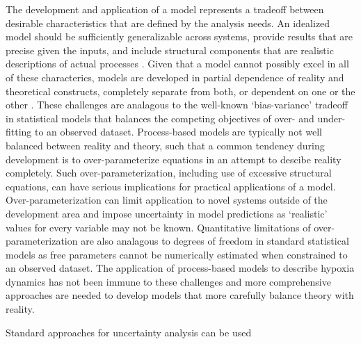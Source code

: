 \documentclass[letterpaper,12pt,oneside]{article}\usepackage[]{graphicx}\usepackage[]{color}
\begin{document}
The development and application of a model represents a tradeoff between desirable characteristics that are defined by the analysis needs.  An idealized model should be sufficiently generalizable across systems, provide results that are precise given the inputs, and include structural components that are realistic descriptions of actual processes \citep{Levins66}. Given that a model cannot possibly excel in all of these characterics, models are developed in partial dependence of reality and theoretical constructs, completely separate from both, or dependent on one or the other \citep{Morrison99}.  These challenges are analagous to the well-known `bias-variance' tradeoff in statistical models that balances the competing objectives of over- and under-fitting to an observed dataset. Process-based models are typically not well balanced between reality and theory, such that a common tendency during development is to over-parameterize equations in an attempt to descibe reality completely.  Such over-parameterization, including use of excessive structural equations, can have serious implications for practical applications of a model.  Over-parameterization can limit application to novel systems outside of the development area and impose uncertainty in model predictions as `realistic' values for every variable may not be known.    Quantitative limitations of over-parameterization are also analagous to degrees of freedom in standard statistical models as free parameters cannot be numerically estimated when constrained to an observed dataset.  The application of process-based models to describe hypoxia dynamics has not been immune to these challenges and more comprehensive approaches are needed to develop models that more carefully balance theory with reality.  

Standard approaches for uncertainty analysis can be used 
\end{document}

